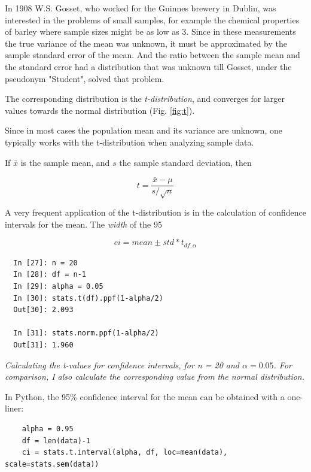 In 1908 W.S. Gosset, who worked for the Guinnes brewery in Dublin, was interested in the problems of small samples, for example the chemical properties of barley where sample sizes might be as low as 3. Since in these measurements the true variance of the mean was unknown, it must be approximated by the sample standard error of the mean. And the ratio between the sample mean and the standard error had a distribution that was unknown till Gosset, under the  pseudonym "Student", solved that problem.

The corresponding distribution is the \emph{t-distribution}, and converges for larger values towards the normal distribution (Fig. \ref{fig:t}).

Since in most cases the population mean and its variance are unknown, one typically works with the t-distribution when analyzing sample data.

If $\bar{x}$ is the sample mean, and $s$ the sample standard deviation, then

\begin{equation}
  t = \frac{\bar{x}-\mu}{s/ \sqrt{n}}
\end{equation}\label{eq:Tdistribution}

A very frequent application of the t-distribution is in the calculation of confidence intervals for the mean. The \emph{width }of the 95%

\begin{equation}
  ci = mean \pm std * t_{df,\alpha}
\end{equation}\label{eq:ci_t}

\begin{lstlisting}
  In [27]: n = 20
  In [28]: df = n-1
  In [29]: alpha = 0.05
  In [30]: stats.t(df).ppf(1-alpha/2)
  Out[30]: 2.093

  In [31]: stats.norm.ppf(1-alpha/2)
  Out[31]: 1.960
\end{lstlisting}

\emph{Calculating the t-values for confidence intervals, for n = 20 and $\alpha=0.05$. For comparison, I also calculate the corresponding value from the normal distribution.}

In Python, the 95\% confidence interval for the mean can be obtained with a one-liner:

\begin{lstlisting}
    alpha = 0.95
    df = len(data)-1
    ci = stats.t.interval(alpha, df, loc=mean(data), scale=stats.sem(data))
\end{lstlisting}

